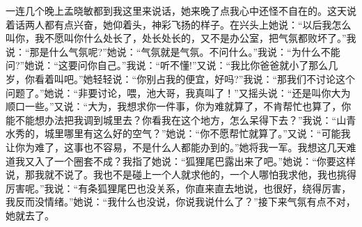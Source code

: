 \documentclass[12pt,oneside]{book}
\begin{document}
一连几个晚上孟晓敏都到我这里来说话，她来晚了点我心中还怪不自在的。这天说着话两人都有点兴奋，她仰着头，神彩飞扬的样子。在兴头上她说：``以后我怎么叫你，我不愿叫你什么处长了，处长处长的，又不是办公室，把气氛都败坏了。''我说：``那是什么气氛呢?''她说：``气氛就是气氛。不问什么。''我说：``为什么不能问?''她说：``这要问你自己。''我说：``听不懂!''又说：``我比你爸爸就小了那么几岁，你看着叫吧。''她轻轻说：``你别占我的便宜，好吗?''我说：``那我们不讨论这个问题了。''她说：``非要讨论，喂，池大哥，我真叫了！''又摇头说：``还是叫你大为顺口一些。''又说：``大为，我想求你一件事，你为难就算了，不肯帮忙也算了，你能不能想办法把我调到城里去？你看我在这个地方，怎么呆得下去？''我说：``山青水秀的，城里哪里有这么好的空气？''她说：``你不愿帮忙就算了。''又说：``可能我让你为难了，这事也不容易，不是什么人都能办到的。''她将我一军。我想这几天难道我又入了一个圈套不成？我指了她说：``狐狸尾巴露出来了吧。''她说：``你要这样说，那我就不说了。我也不是碰上一个人就求他的，一个人哪怕我求他，我也挑得厉害呢。''我说：``有条狐狸尾巴也没关系，你直来直去地说，也很好，绕得厉害，我反而没情绪。''她说：``我什么也没说，你说我说什么了？''接下来气氛有点不对，她就去了。
\end{document}

